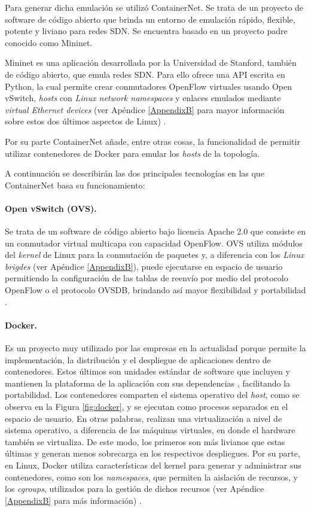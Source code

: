 Para generar dicha emulación se utilizó ContainerNet. Se trata de un proyecto de
software de código abierto \parencite{cnet_git} que brinda un entorno de
emulación rápido, flexible, potente y liviano para redes SDN. Se encuentra
basado en un proyecto padre conocido como Mininet.

Mininet es una aplicación desarrollada por la Universidad de
Stanford, también de código abierto, que emula redes SDN. Para ello ofrece una
API escrita en Python, la cual permite crear conmutadores OpenFlow virtuales
usando Open vSwitch, \textit{hosts} con \textit{Linux network namespaces} y
enlaces emulados mediante \textit{virtual Ethernet devices} (ver Apéndice
\ref{AppendixB} para mayor información sobre estos dos últimos aspectos de
Linux) \parencite {mininet_wiki}.

Por su parte ContainerNet añade, entre otras cosas, la funcionalidad de permitir
utilizar contenedores de Docker para emular los \textit{hosts} de la topología.

A continuación se describirán las dos principales tecnologías en las que
ContainerNet basa su funcionamiento:

\paragraph{Open vSwitch (OVS).} Se trata de un software de código abierto bajo
licencia Apache 2.0 que consiste en un conmutador virtual multicapa con
capacidad OpenFlow. OVS utiliza módulos del \textit{kernel} de Linux para la 
conmutación de paquetes y, a
diferencia con los \textit{Linux brigdes} (ver Apéndice \ref{AppendixB}), puede
ejecutarse en espacio de usuario permitiendo la configuración de las
tablas de reenvío por medio del protocolo OpenFlow o el protocolo OVSDB, brindando así 
mayor flexibilidad y
portabilidad \parencite{ovs_switch} \parencite{rfc7047}.


\paragraph{Docker.} Es un proyecto muy utilizado por las empresas en la
actualidad porque permite la implementación, la distribución y el despliegue de
aplicaciones dentro de contenedores. Estos últimos son unidades estándar de
software que incluyen y mantienen la plataforma de la aplicación con sus
dependencias \parencite{dif_docker_vm}, facilitando la portabilidad. Los
contenedores comparten el sistema operativo del \textit{host}, como se observa
en la Figura \ref{fig:docker}, y se ejecutan como procesos separados en el
espacio de usuario. En otras palabras, realizan una virtualización a nivel de
sistema operativo, a diferencia de las máquinas virtuales, en donde el hardware
también se virtualiza. De este modo, los primeros son más livianos que estas
últimas y generan menos sobrecarga en los respectivos despliegues. Por su parte,
en Linux, Docker utiliza características del kernel para generar y administrar
sus contenedores, como son los \textit{namespaces}, que permiten la aislación de
recursos, y los \textit{cgroups}, utilizados para la gestión de dichos recursos
(ver Apéndice \ref{AppendixB} para más información) \parencite{wisc_docker}.

